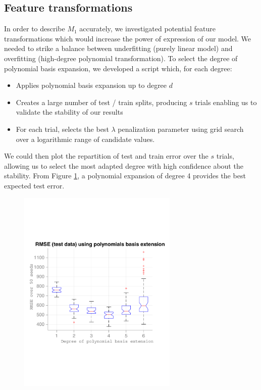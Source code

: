 \documentclass{article} %
\begin{document}
  \subsection{Feature transformations}
  In order to describe $M_1$ accurately, we investigated potential feature transformations which would increase the power of expression of our model. We needed to strike a balance between underfitting (purely linear model) and overfitting (high-degree polynomial transformation). To select the degree of polynomial basis expansion, we developed a script which, for each degree:
  \begin{itemize}
    \item Applies polynomial basis expansion up to degree $d$
    \item Creates a large number of test / train splits, producing $s$ trials enabling us to validate the stability of our results
    \item For each trial, selects the best $\lambda$ penalization parameter using grid search over a logarithmic range of candidate values. 
  \end{itemize}

  We could then plot the repartition of test and train error over the $s$ trials, allowing us to select the most adapted degree with high confidence about the stability. From Figure \ref{fig:basisExpansionTestError}, a polynomial expansion of degree 4 provides the best expected test error.

  \begin{figure}[h]
    \center
    \includegraphics[width=3in]{figures/regression/basis-extension-test-error.pdf}
    \caption{}
    \label{fig:basisExpansionTestError}
  \end{figure}
\end{document}
